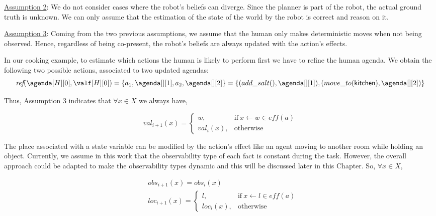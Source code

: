 {\underline{Assumption 2}: We do not consider cases where the robot's beliefs can diverge. Since the planner is part of the robot, the actual ground truth is unknown. We can only assume that the estimation of the state of the world by the robot is correct and reason on it.

\underline{Assumption 3}: Coming from the two previous assumptions, we assume that the human only makes deterministic moves when not being observed. Hence, regardless of being co-present, the robot's beliefs are always updated with the action's effects.

In our cooking example, to estimate which actions the human is likely to perform first we have to refine the human agenda. We obtain the following two possible actions, associated to two updated agendas:\\
{\small
\begin{equation*}
    \textit{ref}(\agenda[H][0], \valf[H][0]) = \{ a_1,\agenda[][1], a_2,\agenda[][2] \}= \{ (add\_salt(),\agenda[][1]), (move\_to(\textsf{kitchen}),\agenda[][2]) \}
\end{equation*}
}

Thus, Assumption 3 indicates that $\forall x \in X$ we always have,

\begin{equation}
    val_{i+1}(x) = \left\{ 
    \begin{array}{ll}
        w, & \mbox{if} ~ x \leftarrow w \in \textit{eff}(a)   \\ 
        val_i(x), & \mbox{otherwise}
    \end{array}\right.
\end{equation}

The place associated with a state variable can be modified by the action's effect like an agent moving to another room while holding an object. 
Currently, we assume in this work that the observability type of each fact is constant during the task. 
However, the overall approach could be adapted to make the observability types dynamic and this will be discussed later in this Chapter.
So, $\forall x \in X$,

\begin{align}
    &obs_{i+1}(x) = obs_i(x)\\
    &loc_{i+1}(x) = \left\{ 
    \begin{array}{ll}
        l, & \mbox{if} ~ x \leftarrow l \in \textit{eff}(a)\\
        loc_i(x), & \mbox{otherwise}
    \end{array}\right.
\end{align}

}
